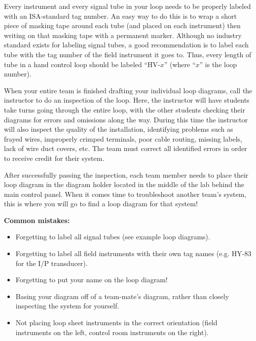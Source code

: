 Every instrument and every signal tube in your loop needs to be properly labeled with an ISA-standard tag number.  An easy way to do this is to wrap a short piece of masking tape around each tube (and placed on each instrument) then writing on that masking tape with a permanent marker.  Although no industry standard exists for labeling signal tubes, a good recommendation is to label each tube with the tag number of the field instrument it goes to.  Thus, every length of tube in a hand control loop should be labeled ``HV-$x$'' (where ``$x$'' is the loop number).

When your entire team is finished drafting your individual loop diagrams, call the instructor to do an inspection of the loop.  Here, the instructor will have students take turns going through the entire loop, with the other students checking their diagrams for errors and omissions along the way.  During this time the instructor will also inspect the quality of the installation, identifying problems such as frayed wires, improperly crimped terminals, poor cable routing, missing labels, lack of wire duct covers, etc.  The team must correct all identified errors in order to receive credit for their system.  

After successfully passing the inspection, each team member needs to place their loop diagram in the diagram holder located in the middle of the lab behind the main control panel.  When it comes time to troubleshoot another team's system, this is where you will go to find a loop diagram for that system!

\vskip 10pt

{\bf Common mistakes:}

\begin{itemize}
\item Forgetting to label all signal tubes (see example loop diagrams).
\item Forgetting to label all field instruments with their own tag names (e.g. HY-83 for the I/P transducer).
\item Forgetting to put your name on the loop diagram!
\item Basing your diagram off of a team-mate's diagram, rather than closely inspecting the system for yourself.
\item Not placing loop sheet instruments in the correct orientation (field instruments on the left, control room instruments on the right).
\end{itemize}

\vskip 10pt

